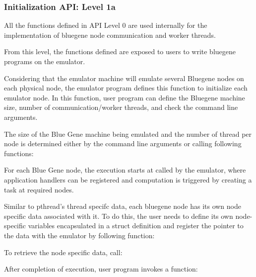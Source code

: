 \subsubsection{Initialization API: Level 1a}

All the functions defined in API Level 0 are used internally for the 
implementation of bluegene node communication and worker threads.

From this level, the functions defined are exposed to users to write bluegene
programs on the emulator.

Considering that the emulator machine will emulate several Bluegene nodes on
each physical node, the emulator program defines this function 
 to initialize each emulator
node. In this function, user program can define the Bluegene machine size,
number of communication/worker threads, and check the command line arguments.

The size of the Blue Gene machine being emulated and the number of thread per
node is determined either by the command line arguments or calling following
functions:





For each Blue Gene node, the execution starts at 
 called by the emulator,
where application handlers can be registered and computation 
is triggered by creating a task at required nodes.

Similar to pthread's thread specifc data, each bluegene node has its
own node specific data associated with it. To do this, the user needs to define its 
own node-specific variables encapsulated in a struct definition and register
 the pointer to the data with the emulator by following function:


To retrieve the node specific data, call:


After completion of execution, user program invokes a function:

